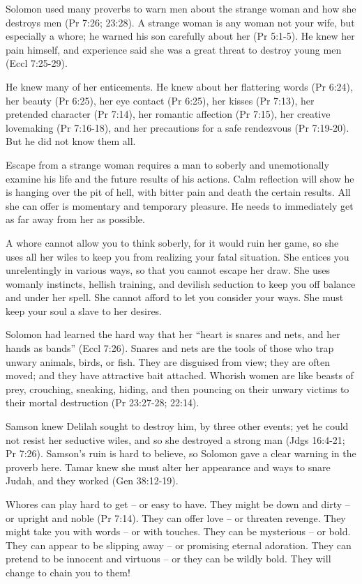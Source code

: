Solomon used many proverbs to warn men about the strange woman and how she destroys men (Pr 7:26; 23:28). A strange woman is any woman not your wife, but especially a whore; he warned his son carefully about her (Pr 5:1-5). He knew her pain himself, and experience said she was a great threat to destroy young men (Eccl 7:25-29).

He knew many of her enticements. He knew about her flattering words (Pr 6:24), her beauty (Pr 6:25), her eye contact (Pr 6:25), her kisses (Pr 7:13), her pretended character (Pr 7:14), her romantic affection (Pr 7:15), her creative lovemaking (Pr 7:16-18), and her precautions for a safe rendezvous (Pr 7:19-20). But he did not know them all.

Escape from a strange woman requires a man to soberly and unemotionally examine his life and the future results of his actions. Calm reflection will show he is hanging over the pit of hell, with bitter pain and death the certain results. All she can offer is momentary and temporary pleasure. He needs to immediately get as far away from her as possible.

A whore cannot allow you to think soberly, for it would ruin her game, so she uses all her wiles to keep you from realizing your fatal situation. She entices you unrelentingly in various ways, so that you cannot escape her draw. She uses womanly instincts, hellish training, and devilish seduction to keep you off balance and under her spell. She cannot afford to let you consider your ways. She must keep your soul a slave to her desires.

Solomon had learned the hard way that her “heart is snares and nets, and her hands as bands” (Eccl 7:26). Snares and nets are the tools of those who trap unwary animals, birds, or fish. They are disguised from view; they are often moved; and they have attractive bait attached. Whorish women are like beasts of prey, crouching, sneaking, hiding, and then pouncing on their unwary victims to their mortal destruction (Pr 23:27-28; 22:14).

Samson knew Delilah sought to destroy him, by three other events; yet he could not resist her seductive wiles, and so she destroyed a strong man (Jdgs 16:4-21; Pr 7:26). Samson’s ruin is hard to believe, so Solomon gave a clear warning in the proverb here. Tamar knew she must alter her appearance and ways to snare Judah, and they worked (Gen 38:12-19).

Whores can play hard to get – or easy to have. They might be down and dirty – or upright and noble (Pr 7:14). They can offer love – or threaten revenge. They might take you with words – or with touches. They can be mysterious – or bold. They can appear to be slipping away – or promising eternal adoration. They can pretend to be innocent and virtuous – or they can be wildly bold. They will change to chain you to them!

